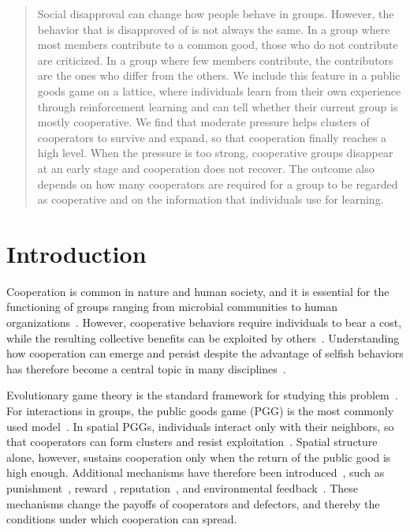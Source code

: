 \documentclass[%
  aip,cha,
  amsmath,amssymb,
  reprint,
  floatfix,
  article-title,
]{revtex4-2}
\begin{document}
\begin{quotation}
Social disapproval can change how people behave in groups. However, the behavior that is disapproved of is not always the same. In a group where most members contribute to a common good, those who do not contribute are criticized. In a group where few members contribute, the contributors are the ones who differ from the others. We include this feature in a public goods game on a lattice, where individuals learn from their own experience through reinforcement learning and can tell whether their current group is mostly cooperative. We find that moderate pressure helps clusters of cooperators to survive and expand, so that cooperation finally reaches a high level. When the pressure is too strong, cooperative groups disappear at an early stage and cooperation does not recover. The outcome also depends on how many cooperators are required for a group to be regarded as cooperative and on the information that individuals use for learning.
\end{quotation}

\section{Introduction}\label{sec:intro}

Cooperation is common in nature and human society, and it is essential for the functioning of groups ranging from microbial communities to human organizations~\cite{axelrod1981evolution,rand2013human}.
However, cooperative behaviors require individuals to bear a cost, while the resulting collective benefits can be exploited by others~\cite{sigmund2010calculus}.
Understanding how cooperation can emerge and persist despite the advantage of selfish behaviors has therefore become a central topic in many disciplines~\cite{pennisi2005did}.

Evolutionary game theory is the standard framework for studying this problem~\cite{smith1973logic,taylor1978evolutionary,nowak2006evolutionary}.
For interactions in groups, the public goods game (PGG) is the most commonly used model~\cite{hauert2006evolutionary,szolnoki2016competition,zhu2024stochastic}.
In spatial PGGs, individuals interact only with their neighbors, so that cooperators can form clusters and resist exploitation~\cite{nowak1992evolutionary,ohtsuki2006simple,szabo2007evolutionary,szolnoki2009impact,perc2013evolutionary,perc2017statistical,zhu2025multilayer}.
Spatial structure alone, however, sustains cooperation only when the return of the public good is high enough.
Additional mechanisms have therefore been introduced~\cite{perc2010coevolutionary}, such as punishment~\cite{fehr2002altruistic,helbing2010punish,chen2014probabilistic,szolnoki2017antisocial,xie2024regulation}, reward~\cite{rand2009positive,szolnoki2010reward}, reputation~\cite{milinski2002helps,zhu2024synergy}, and environmental feedback~\cite{weitz2016oscillating,tilman2020evolutionary,wang2020eco,hu2025dynamic}.
These mechanisms change the payoffs of cooperators and defectors, and thereby the conditions under which cooperation can spread.
\end{document}
